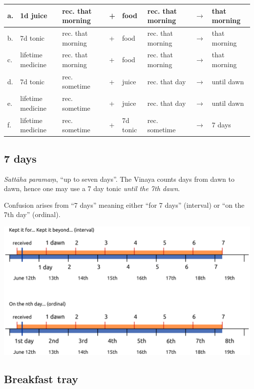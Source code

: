 \begin{center}
\begin{tabular}{llllllll}
a. & 1d juice & rec. that morning & + & food & rec. that morning & \(\rightarrow\) & that morning\\
\hline
b. & 7d tonic & rec. that morning & + & food & rec. that morning & \(\rightarrow\) & that morning\\
\hline
c. & lifetime medicine & rec. that morning & + & food & rec. that morning & \(\rightarrow\) & that morning\\
\hline
d. & 7d tonic & rec. sometime & + & juice & rec. that day & \(\rightarrow\) & until dawn\\
\hline
e. & lifetime medicine & rec. sometime & + & juice & rec. that day & \(\rightarrow\) & until dawn\\
\hline
f. & lifetime medicine & rec. sometime & + & 7d tonic & rec. sometime & \(\rightarrow\) & 7 days\\
\end{tabular}
\end{center}

\subsection{7 days}

\emph{Sattāha paramaṃ}, ``up to seven days''. The Vinaya counts days
from dawn to dawn, hence one may use a 7 day tonic \emph{until the 7th
dawn}.

Confusion arises from ``7 days'' meaning either ``for 7 days''
(interval) or ``on the 7th day'' (ordinal).

\vspace*{\baselineskip}
\includegraphics[width=\linewidth]{../../src/includes/figures/7-days.png}

\subsection{Breakfast tray}

